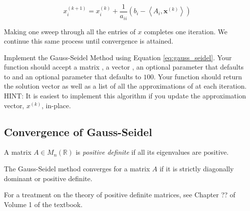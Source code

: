 \begin{equation} \label{eq:gauss_seidel}
x^{(k+1)}_i = x^{(k)}_i + \frac{1}{a_{ii}} \left ( b_i - \left < A_i, \mathbf{x}^{(k)}\right >\right)
\end{equation}

Making one sweep through all the entries of $x$ completes one iteration. We
continue this same process until convergence is attained.

\begin{problem} \label{prob:gauss_seidel}
Implement the Gauss-Seidel Method using Equation \ref{eq:gauss_seidel}. Your
function should accept a matrix , a vector , an optional parameter
 that defaults to  and an optional parameter  that
defaults to $100$. Your function should return the solution vector  as
well as a list of all the approximations of  at each iteration. HINT: It is
easiest to implement this algorithm if you update the approximation vector, $x^{(k)}$, in-place.
\end{problem}

\subsection*{Convergence of Gauss-Seidel} %

\begin{definition}
    A matrix $A \in M_n(\mathbb{R})$ is \emph{positive definite} if all its
    eigenvalues are positive.
\end{definition}

\begin{theorem}
    The Gauss-Seidel method converges for a matrix $A$ if it is strictly
    diagonally dominant or positive definite.
\end{theorem}

For a treatment on the theory of positive definite matrices, see Chapter ?? of
Volume 1 of the textbook.

